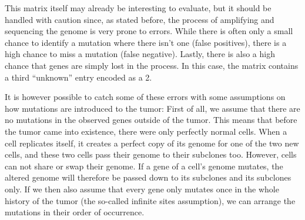 This matrix itself may already be interesting to evaluate, but it should be handled with caution since, as stated before, the process of amplifying and sequencing the genome is very prone to errors. While there is often only a small chance to identify a mutation where there isn't one (false positives), there is a high chance to miss a mutation (false negative). Lastly, there is also a high chance that genes are simply lost in the process. In this case, the matrix contains a third ``unknown'' entry encoded as a 2.


It is however possible to catch some of these errors with some assumptions on how mutations are introduced to the tumor: First of all, we assume that there are no mutations in the observed genes outside of the tumor. This means that before the tumor came into existence, there were only perfectly normal cells. When a cell replicates itself, it creates a perfect copy of its genome for one of the two new cells, and these two cells pass their genome to their subclones too. However, cells can not share or swap their genome. If a gene of a cell's genome mutates, the altered genome will therefore be passed down to its subclones and its subclones only. If we then also assume that every gene only mutates once in the whole history of the tumor (the so-called infinite sites assumption), we can arrange the mutations in their order of occurrence.


